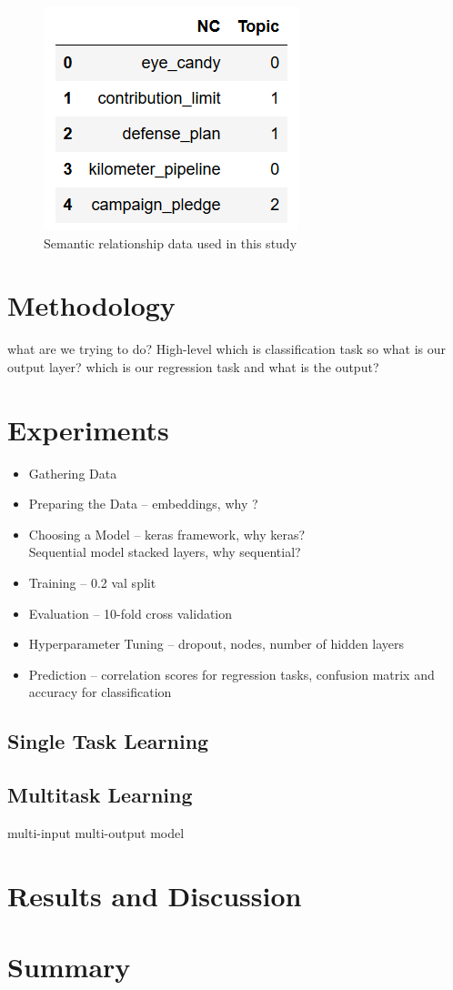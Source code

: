 \begin{figure}[!htb]
\centering
\includegraphics[width=.4\textwidth]{Figures/Tratz.PNG}
\caption{Semantic relationship data used in this study}
\end{figure}
\section{Methodology}
what are we trying to do? High-level
which is classification task so what is our output layer?
which is our regression task and what is the output?
\section{Experiments}
\begin{itemize}
    \item Gathering Data
    \item Preparing the Data -- \infersent embeddings, why \infersent?
    \item Choosing a Model -- keras framework, why keras? \\ Sequential model stacked layers, why sequential?
    \item Training -- 0.2 val split
    \item Evaluation -- 10-fold cross validation
    \item Hyperparameter Tuning -- dropout, nodes, number of hidden layers
    \item Prediction -- correlation scores for regression tasks, confusion matrix and accuracy for classification
\end{itemize}
\subsection{Single Task Learning}
\subsection{Multitask Learning}
multi-input multi-output model
\section{Results and Discussion}
\section{Summary}